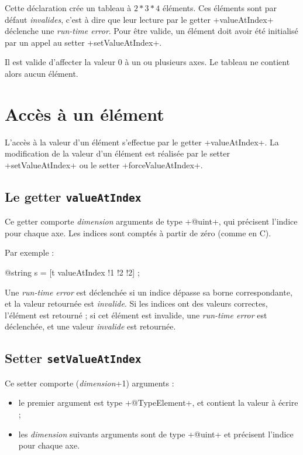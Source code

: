 Cette déclaration crée un tableau à $2*3*4$ éléments. Ces éléments sont par défaut \emph{invalides}, c'est à dire que leur lecture par le getter \ggs+valueAtIndex+ déclenche une \emph{run-time error}. Pour être valide, un élément doit avoir été initialisé par un appel au setter \ggs+setValueAtIndex+.

Il est valide d'affecter la valeur $0$ à un ou plusieurs axes. Le tableau ne contient alors aucun élément.


\section{Accès à un élément}

L'accès à la valeur d'un élément s'effectue par le getter \ggs+valueAtIndex+. La modification de la valeur d'un élément est réalisée par le setter \ggs+setValueAtIndex+ ou le setter \ggs+forceValueAtIndex+.

\subsection{Le getter \texttt{valueAtIndex}}

Ce getter comporte \emph{dimension} arguments de type \ggs+@uint+, qui précisent l'indice pour chaque axe. Les indices sont comptés à partir de zéro (comme en C).

Par exemple :
\begin{galgas}
  @string s = [t valueAtIndex !1 !2 !2] ;
\end{galgas}


Une \emph{run-time error} est déclenchée si un indice dépasse sa borne correspondante, et la valeur retournée est \emph{invalide}. Si les indices ont des valeurs correctes, l'élément est retourné ; si cet élément est invalide, une \emph{run-time error} est déclenchée, et une valeur \emph{invalide} est retournée.






\subsection{Setter \texttt{setValueAtIndex}}

Ce setter comporte (\emph{dimension}+1) arguments :
\begin{itemize}
  \item le premier argument est type \ggs+@TypeElement+, et contient la valeur à écrire ;
  \item les \emph{dimension} suivants arguments sont de type \ggs+@uint+ et précisent l'indice pour chaque axe.
\end{itemize} 
  

